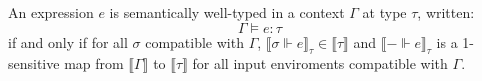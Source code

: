 \begin{definition}
  An expression $e$ is semantically well-typed in a context $\Gamma$ at type
  $\tau$, written:
  $$\Gamma \vDash e : \tau$$
  if and only if for all $\sigma$ compatible with $\Gamma$, $\llbracket
  \sigma \Vdash e \rrbracket_{\tau} \in \llbracket \tau \rrbracket$ and
  $\llbracket - \Vdash e \rrbracket_{\tau}$ is a 1-sensitive map from
  $\llbracket \Gamma \rrbracket$ to $\llbracket \tau \rrbracket$ for all input
  enviroments compatible with $\Gamma$.
\end{definition}

